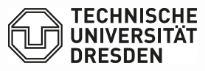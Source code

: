 \documentclass[
	a4paper, %
	12pt, %
]{persist}
\begin{document}

\thispagestyle{empty} %

\begin{fullwidth} %
	\vspace*{-0.075\textheight} %
	
	\hfill\includegraphics[width=5cm]{img/tu.pdf} %

	\vspace{0.15\textheight} %

	\parbox{0.9\fulltextwidth}{\fontsize{50pt}{52pt}\selectfont\raggedright\textbf{\reporttitle}\par} %
	
	\vspace{0.03\textheight} %
	
	{\LARGE\textit{\textbf{\reportsubtitle}}\par} %
	
	\vfill %
	
	{\Large\reportauthors\par} %
	
	\vfill\vfill\vfill %
	
	{\large\reportdate\par} %
\end{fullwidth}

\newpage


\thispagestyle{empty} %
\end{document}
